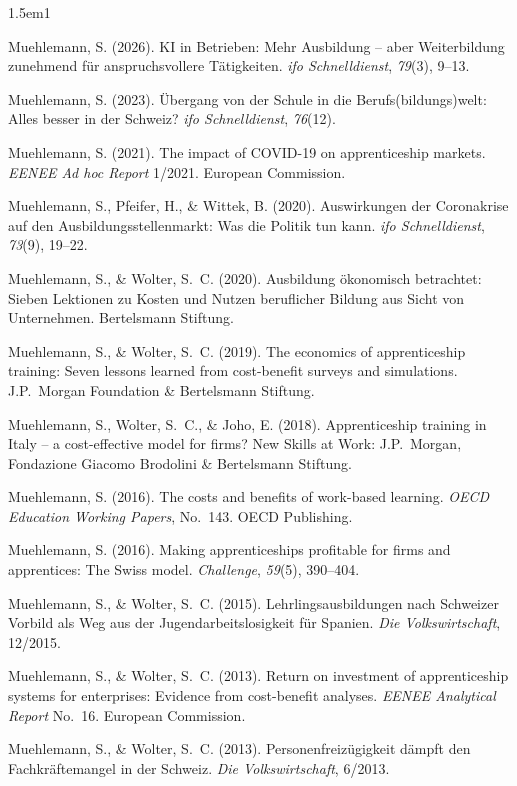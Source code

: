 \documentclass[11pt,a4paper]{article}
\begin{document}
\begin{hangparas}{1.5em}{1}

Muehlemann, S. (2026). KI in Betrieben: Mehr Ausbildung -- aber Weiterbildung zunehmend f\"ur anspruchsvollere T\"atigkeiten. \textit{ifo Schnelldienst}, \textit{79}(3), 9--13.

Muehlemann, S. (2023). \"Ubergang von der Schule in die Berufs(bildungs)welt: Alles besser in der Schweiz? \textit{ifo Schnelldienst}, \textit{76}(12).

Muehlemann, S. (2021). The impact of COVID-19 on apprenticeship markets. \textit{EENEE Ad hoc Report} 1/2021. European Commission.

Muehlemann, S., Pfeifer, H., \& Wittek, B. (2020). Auswirkungen der Coronakrise auf den Ausbildungsstellenmarkt: Was die Politik tun kann. \textit{ifo Schnelldienst}, \textit{73}(9), 19--22.

Muehlemann, S., \& Wolter, S.~C. (2020). Ausbildung \"okonomisch betrachtet: Sieben Lektionen zu Kosten und Nutzen beruflicher Bildung aus Sicht von Unternehmen. Bertelsmann Stiftung.

Muehlemann, S., \& Wolter, S.~C. (2019). The economics of apprenticeship training: Seven lessons learned from cost-benefit surveys and simulations. J.P.~Morgan Foundation \& Bertelsmann Stiftung.

Muehlemann, S., Wolter, S.~C., \& Joho, E. (2018). Apprenticeship training in Italy -- a cost-effective model for firms? New Skills at Work: J.P.~Morgan, Fondazione Giacomo Brodolini \& Bertelsmann Stiftung.

Muehlemann, S. (2016). The costs and benefits of work-based learning. \textit{OECD Education Working Papers}, No.~143. OECD Publishing.

Muehlemann, S. (2016). Making apprenticeships profitable for firms and apprentices: The Swiss model. \textit{Challenge}, \textit{59}(5), 390--404.

Muehlemann, S., \& Wolter, S.~C. (2015). Lehrlingsausbildungen nach Schweizer Vorbild als Weg aus der Jugendarbeitslosigkeit f\"ur Spanien. \textit{Die Volkswirtschaft}, 12/2015.

Muehlemann, S., \& Wolter, S.~C. (2013). Return on investment of apprenticeship systems for enterprises: Evidence from cost-benefit analyses. \textit{EENEE Analytical Report} No.~16. European Commission.

Muehlemann, S., \& Wolter, S.~C. (2013). Personenfreiz\"ugigkeit d\"ampft den Fachkr\"aftemangel in der Schweiz. \textit{Die Volkswirtschaft}, 6/2013.


\end{hangparas}
\end{document}
